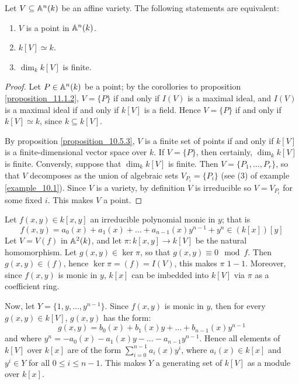 \begin{proposition}\label{proposition_11.1.4}
  Let $V \subseteq \mathbb{A}^n(k)$ be an affine variety. The following
  statements are equivalent:
  \begin{enumerate}
    \item[(1)] $V$ is a point in $\mathbb{A}^n(k)$.

    \item[(2)] $k[V] \simeq k$.

    \item[(3)] $\dim_k{k[V]}$ is finite.
  \end{enumerate}
\end{proposition}
\begin{proof}
  Let $P \in \mathbb{A}^n(k)$ be a point; by the corollories to proposition
  \ref{proposition_11.1.2}, $V=\{P\}$ if and only if $I(V)$ is a
  maximal ideal, and $I(V)$ is a maximal ideal if and only if $k[V]$
  is a field. Hence $V=\{P\}$ if and only if $k[V] \simeq k$, since
  $k \subseteq k[V]$.

  By proposition \ref{proposition_10.5.3}, $V$ is a finite set of
  points if and only if $k[V]$ is a finite-dimensional vector space
  over $k$. If $V=\{P\}$, then certainly, $\dim_k{k[V]}$ is finite.
  Conversly, suppose that $\dim_k{k[V]}$ is finite. Then $V=\{P_1,
  \dots, P_r\}$, so that $V$ decomposes as the union of algebraic
  sets $V_{P_i}=\{P_i\}$ (see (3) of example \ref{example_10.1}). Since
  $V$ is a variety, by definition $V$ is irreducible so $V=V_{P_i}$
  for some fixed $i$. This makes $V$ a point.
\end{proof}

\begin{example}\label{example_11.1}
  Let $f(x,y) \in k[x,y]$ an irreducible polynomial monic in $y$;
  that is
  \begin{equation*}
    f(x,y)=a_0(x)+a_1(x)+\dots+a_{n-1}(x)y^{n-1}+y^n \in (k[x])[y]
  \end{equation*}
  Let $V=V(f)$ in $\mathbb{A}^2(k)$, and let $\pi:k[x,y] \xrightarrow{}
  k[V]$ be the natural homomorphism. Let $g(x,y) \in \ker{\pi}$, so
  that $g(x,y) \equiv 0 \mod{f}$. Then $g(x,y) \in (f)$, hence
  $\ker{\pi}=(f)=I(V)$, this makes $\pi$  $1-1$. Moreover, since
  $f(x,y)$ is monic in $y$, $k[x]$ can be imbedded into $k[V]$ via
  $\pi$ as a coefficient ring.

  Now, let $Y=\{1, y, \dots, y^{n-1}\}$. Since $f(x,y)$ is monic in
  $y$, then for every  $g(x,y) \in k[V]$, $g(x,y)$ has the form:
  \begin{equation*}
    g(x,y)=b_0(x)+b_1(x)y+\dots+b_{n-1}(x)y^{n-1}
  \end{equation*}
  and where $y^n=-a_0(x)-a_1(x)y-\dots-a_{n-1}y^{n-1}$. Hence all
  elements of $k[V]$ over $k[x]$ are of the form
  $\sum_{i=0}^{n-1}{a_i(x)y^i}$, where $a_i(x) \in k[x]$ and $y^i
  \in Y$ for all $0 \leq i \leq n-1$. This makes $Y$ a generating
  set of $k[V]$ as a module over $k[x]$.
\end{example}

